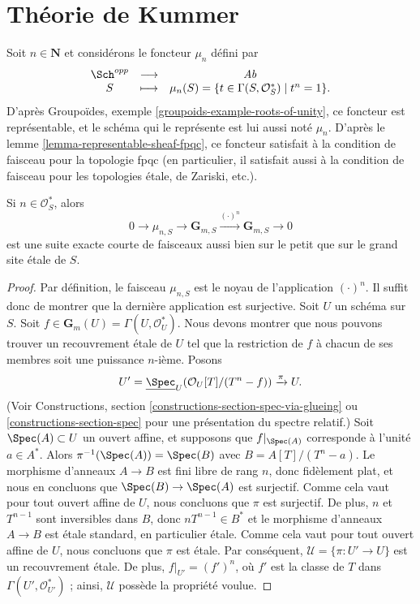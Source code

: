 \section{Th\'eorie de Kummer}
\label{section-kummer}

\noindent
Soit $n \in \mathbf{N}$ et consid\'erons le foncteur $\mu_n$ d\'efini par
$$
\begin{matrix}
\Sch^{opp} & \longrightarrow & \textit{Ab} \\
S & \longmapsto &
\mu_n(S)
=
\{t \in \Gamma(S, \mathcal{O}_S^*) \mid t^n = 1 \}.
\end{matrix}
$$
D'apr\`es
Groupoïdes, exemple \ref{groupoids-example-roots-of-unity},
ce foncteur est repr\'esentable, et le sch\'ema qui le repr\'esente
est lui aussi not\'e $\mu_n$. D'apr\`es le
lemme \ref{lemma-representable-sheaf-fpqc},
ce foncteur satisfait \`a la condition de faisceau pour la topologie fpqc
(en particulier, il satisfait aussi \`a la condition de faisceau pour les
topologies \'etale, de Zariski, etc.).

\begin{lemma}
\label{lemma-kummer-sequence}
Si $n\in \mathcal{O}_S^*$, alors
$$
0 \to
\mu_{n, S} \to
\mathbf{G}_{m, S} \xrightarrow{(\cdot)^n}
\mathbf{G}_{m, S} \to 0
$$
est une suite exacte courte de faisceaux aussi bien sur le petit que sur le
grand site \'etale de $S$.
\end{lemma}

\begin{proof}
Par d\'efinition, le faisceau $\mu_{n, S}$ est le noyau de l'application
$(\cdot)^n$. Il suffit donc de montrer que la derni\`ere application est surjective.
Soit $U$ un sch\'ema sur $S$. Soit
$f \in \mathbf{G}_m(U) = \Gamma(U, \mathcal{O}_U^*)$.
Nous devons montrer que nous pouvons trouver un recouvrement \'etale de
$U$ tel que la restriction de $f$ \`a chacun de ses membres soit une puissance $n$-i\`eme.
Posons
$$
U' =
\underline{\Spec}_U(\mathcal{O}_U[T]/(T^n-f))
\xrightarrow{\pi}
U.
$$
(Voir
Constructions, section \ref{constructions-section-spec-via-glueing} ou
\ref{constructions-section-spec}
pour une pr\'esentation du spectre relatif.)
Soit $\Spec(A) \subset U$ un ouvert affine, et supposons que $f|_{\Spec(A)}$ corresponde
\`a l'unit\'e $a \in A^*$. Alors $\pi^{-1}(\Spec(A)) = \Spec(B)$ avec
$B = A[T]/(T^n - a)$. Le morphisme d'anneaux $A \to B$ est fini libre de rang $n$,
donc fid\`element plat, et nous en concluons que
$\Spec(B) \to \Spec(A)$ est surjectif. Comme cela vaut pour tout
ouvert affine de $U$, nous concluons que $\pi$ est surjectif.
De plus, $n$ et $T^{n - 1}$ sont inversibles dans $B$, donc
$nT^{n-1} \in B^*$ et le morphisme d'anneaux $A \to B$ est \'etale standard,
en particulier \'etale. Comme cela vaut pour tout ouvert affine de $U$,
nous concluons que $\pi$ est \'etale. Par cons\'equent,
$\mathcal{U} = \{\pi : U' \to U\}$ est un recouvrement \'etale.
De plus, $f|_{U'} = (f')^n$, o\`u $f'$ est la classe de $T$
dans $\Gamma(U', \mathcal{O}_{U'}^*)$ ; ainsi, $\mathcal{U}$ poss\`ede la propri\'et\'e voulue.
\end{proof}

